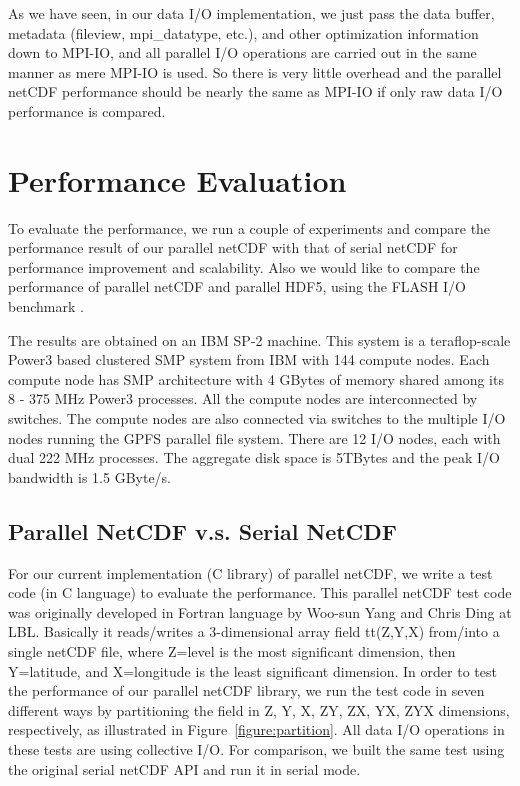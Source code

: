\documentclass[10pt,twocolumn]{article}          %
\begin{document}
As we have seen, in our data I/O implementation, we just pass the data buffer, metadata (fileview,
mpi\_datatype, etc.), and other optimization information down to MPI-IO, and all parallel I/O
operations are carried out in the same manner as mere MPI-IO is used. So there is very little
overhead and the parallel netCDF performance should be nearly the same as MPI-IO if only raw data
I/O performance is compared.

\section{Performance Evaluation}

To evaluate the performance, we run a couple of experiments and compare the performance result of
our parallel netCDF with that of serial netCDF for performance improvement and scalability. Also we
would like to compare the performance of parallel netCDF and parallel HDF5, using the FLASH I/O
benchmark \cite{FLASHIO}.

The results are obtained on an IBM SP-2 machine. This system is a teraflop-scale Power3 based
clustered SMP system from IBM with 144 compute nodes. Each compute node has SMP architecture with 4
GBytes of memory shared among its 8 - 375 MHz Power3 processes. All the compute nodes are
interconnected by switches. The compute nodes are also connected via switches to the multiple I/O
nodes running the GPFS parallel file system. There are 12 I/O nodes, each with dual 222 MHz
processes. The aggregate disk space is 5TBytes and the peak I/O bandwidth is 1.5 GByte/s.

\subsection{Parallel NetCDF v.s. Serial NetCDF}

For our current implementation (C library) of parallel netCDF, we
write a test code (in C language) to evaluate the performance.
This parallel netCDF test code was originally developed in Fortran
language by Woo-sun Yang and Chris Ding at LBL. Basically it
reads/writes a 3-dimensional array field tt(Z,Y,X) from/into a
single netCDF file, where Z=level is the most significant
dimension, then Y=latitude, and X=longitude is the least
significant dimension. In order to test the performance of our
parallel netCDF library, we run the test code in seven different
ways by partitioning the field in Z, Y, X, ZY, ZX, YX, ZYX
dimensions, respectively, as illustrated in
Figure~\ref{figure:partition}. All data I/O operations in these
tests are using collective I/O. For comparison, we built the same
test using the original serial netCDF API and run it in serial
mode.
\end{document}
